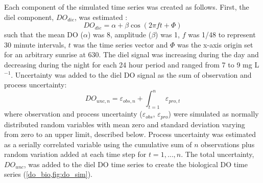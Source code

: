 \documentclass[letterpaper,12pt,oneside]{article}\usepackage[]{graphicx}\usepackage[]{color}
\begin{document}
Each component of the simulated time series was created as follows.  First, the diel component, $DO_{die}$, was estimated \citep{Cryer08}:
\begin{equation} \label{do_sin}
DO_{die} = \alpha + \beta\cos\left(2\pi ft + \Phi\right)
\end{equation}
such that the mean DO ($\alpha$) was 8, amplitude ($\beta$) was 1, $f$ was 1/48 to represent 30 minute intervals, $t$ was the time series vector and $\Phi$ was the x-axis origin set for an arbitrary sunrise at 630.  The diel signal was increasing during the day and decreasing during the night for each 24 hour period and ranged from 7 to 9 mg L$^{-1}$.  Uncertainty was added to the diel \ac{DO} signal as the sum of observation and process uncertainty:
\begin{equation} \label{do_unc_n}
DO_{unc, n} = \varepsilon_{obs, n} + \int_{t = 1}^{n} \varepsilon_{pro, t}
\end{equation}
where observation and process uncertainty ($\varepsilon_{obs}$, $\varepsilon_{pro}$) were simulated as normally distributed random variables with mean zero and standard deviation varying from zero to an upper limit, described below.  Process uncertainty was estimated as a serially correlated variable using the cumulative sum of $n$ observations plus random variation added at each time step for $t = 1, ..., n$.  The total uncertainty, $DO_{unc}$, was added to the diel \ac{DO} time series to create the biological \ac{DO} time series (\cref{do_bio,fig:do_sim}).
\end{document}
